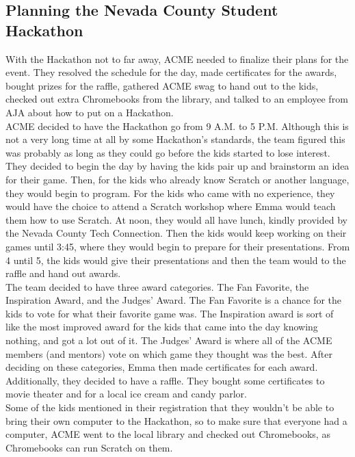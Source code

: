 \documentclass{article}
\begin{document}
\subsection{Planning the Nevada County Student Hackathon}
With the Hackathon not to far away, ACME needed to finalize their plans for the event. They resolved the schedule for the day, made certificates for the awards, bought prizes for the raffle, gathered ACME swag to hand out to the kids, checked out extra Chromebooks from the library, and talked to an employee from AJA about how to put on a Hackathon. \\

ACME decided to have the Hackathon go from 9 A.M. to 5 P.M. Although this is not a very long time at all by some Hackathon's standards, the team figured this was probably as long as they could go before the kids started to lose interest. They decided to begin the day by having the kids pair up and brainstorm an idea for their game. Then, for the kids who already know Scratch or another language, they would begin to program. For the kids who came with no experience, they would have the choice to attend a Scratch workshop where Emma would teach them how to use Scratch. At noon, they would all have lunch, kindly provided by the Nevada County Tech Connection. Then the kids would keep working on their games until 3:45, where they would begin to prepare for their presentations. From 4 until 5, the kids would give their presentations and then the team would to the raffle and hand out awards. \\

The team decided to have three award categories. The Fan Favorite, the Inspiration Award, and the Judges' Award. The Fan Favorite is a chance for the kids to vote for what their favorite game was. The Inspiration award is sort of like the most improved award for the kids that came into the day knowing nothing, and got a lot out of it. The Judges' Award is where all of the ACME members (and mentors) vote on which game they thought was the best. After deciding on these categories, Emma then made certificates for each award. Additionally, they decided to have a raffle. They bought some certificates to movie theater and for a local ice cream and candy parlor. \\

Some of the kids mentioned in their registration that they wouldn't be able to bring their own computer to the Hackathon, so to make sure that everyone had a computer, ACME went to the local library and checked out Chromebooks, as Chromebooks can run Scratch on them. \\
\end{document}

